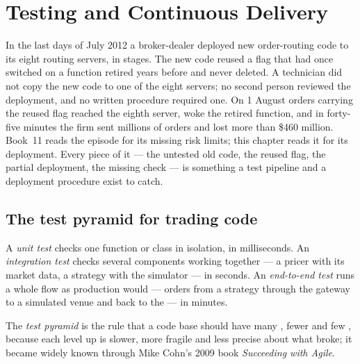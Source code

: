 \chapter{Testing and Continuous Delivery}\label{ch:pl:testing-and-continuous-delivery}

In the last days of July 2012 a broker-dealer deployed new order-routing code to its eight routing servers, in stages. The new code reused a
flag that had once switched on a function retired years before and never deleted. A technician did not copy the new code to one of the eight
servers; no second person reviewed the deployment, and no written procedure required one. On 1 August orders carrying the reused flag reached
the eighth server, woke the retired function, and in forty-five minutes the firm sent millions of orders and lost more than \$460 million. Book~11
reads the episode for its missing risk limits; this chapter reads it for its deployment. Every piece of it --- the untested old code, the
reused flag, the partial deployment, the missing check --- is something a test pipeline and a deployment procedure exist to catch.

\section{The test pyramid for trading code}

\begin{definition}\label{def:pl:testing-and-continuous-delivery:tests}
A \emph{unit test} checks one function or class in isolation, in milliseconds. An \emph{integration test} checks several components working together --- a pricer with its market data, a strategy with the simulator --- in seconds. An
\emph{end-to-end test} runs a whole flow as production would --- orders from a strategy through the gateway to a
simulated venue and back to the  --- in minutes.
\end{definition}

\begin{definition}\label{def:pl:testing-and-continuous-delivery:pyramid}
The \emph{test pyramid} is the rule that a code base should have many , fewer  and few
, because each level up is slower, more fragile and less precise about what broke; it became widely known through Mike Cohn's
2009 book \emph{Succeeding with Agile}.
\end{definition}

